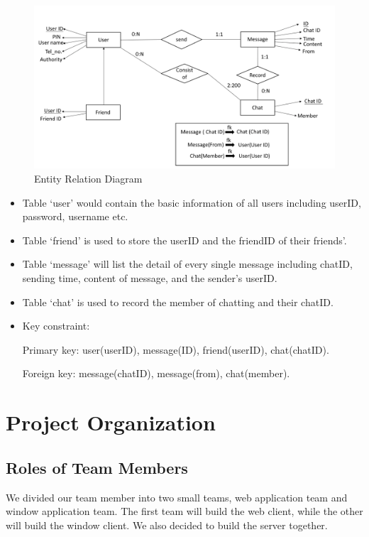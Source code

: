 \documentclass[a4paper]{article}
\begin{document}
\begin{figure}[h]
\centering
\includegraphics[width = 0.85 \textwidth ]{ERD.png}
\caption{\label{fig:ERD}Entity Relation Diagram}
\end{figure}

\begin{itemize}
\item Table ‘user’ would contain the basic information of all users including userID, password, username etc. 
\item Table ‘friend’ is used to store the userID and the friendID of their friends’.
\item Table ‘message’ will list the detail of every single message including chatID, sending time, content of message, and the sender’s userID.
\item Table ‘chat’ is used to record the member of chatting and their chatID. 
\end{itemize}


\begin{itemize}
\item Key constraint:

Primary key: user(userID), message(ID), friend(userID), chat(chatID).

Foreign key: message(chatID), message(from), chat(member).

\end{itemize}


\section{Project Organization}

\subsection{Roles of Team Members}

We divided our team member into two small teams, web application team and window application team. The first team will build the web client, while the other will build the window client. We also decided to build the server together.
\end{document}
